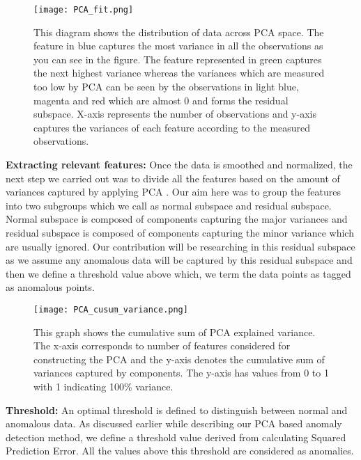\begin{figure}
\centerline{\texttt{[image: PCA\_fit.png]}}
    \caption{This diagram shows the distribution of data across PCA space. The feature in blue captures the most variance in all the observations as you can see in the figure. The feature represented in green captures the next highest variance whereas the variances which are measured too low by PCA can be seen by the observations in light blue, magenta and red which are almost 0 and forms the residual subspace. X-axis represents the number of observations and y-axis captures the variances of each feature according to the measured observations.}
    \label{fig:pca}
\end{figure}

\textbf{Extracting relevant features:} Once the data is smoothed and normalized, the next step we carried out was to divide all the features based on the amount of variances captured by applying PCA . Our aim here was to group the features into two subgroups which we call as normal subspace and residual subspace. Normal subspace is composed of components capturing the major variances and residual subspace is composed of components capturing the minor variance which are usually ignored. Our contribution will be researching in this residual subspace as we assume any anomalous data will be captured by this residual subspace and then we define a threshold value above which, we term the data points as tagged as anomalous points. 
   
\begin{figure}
\centerline{\texttt{[image: PCA\_cusum\_variance.png]}}
    \caption{This graph shows the cumulative sum of PCA explained variance. The x-axis corresponds to number of features considered for constructing the PCA and the y-axis denotes the cumulative sum of variances captured by components. The y-axis has values from 0 to 1 with 1 indicating 100\% variance.}
    \label{fig:PCA_cusum_variance}
\end{figure}

\textbf{Threshold:} An optimal threshold is defined to distinguish between normal and anomalous data. As discussed earlier while describing our PCA based anomaly detection method, we define a threshold value derived from calculating Squared Prediction Error. All the values above this threshold are considered as anomalies. 

